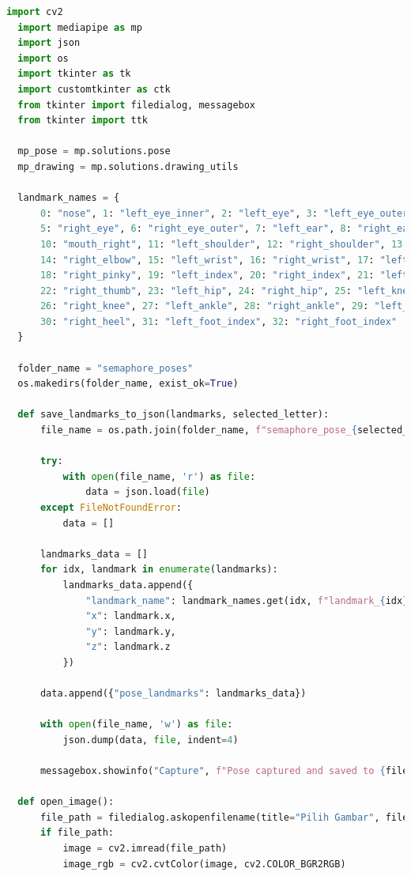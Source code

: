 \documentclass[a4paper,12pt]{article}
\begin{document}
\begin{lstlisting}[language=Python, caption={Kode Program untuk Mendeteksi Landmark Pose}]
  import cv2
  import mediapipe as mp
  import json
  import os
  import tkinter as tk
  import customtkinter as ctk
  from tkinter import filedialog, messagebox
  from tkinter import ttk
  
  mp_pose = mp.solutions.pose
  mp_drawing = mp.solutions.drawing_utils
  
  landmark_names = {
      0: "nose", 1: "left_eye_inner", 2: "left_eye", 3: "left_eye_outer", 4: "right_eye_inner",
      5: "right_eye", 6: "right_eye_outer", 7: "left_ear", 8: "right_ear", 9: "mouth_left", 
      10: "mouth_right", 11: "left_shoulder", 12: "right_shoulder", 13: "left_elbow", 
      14: "right_elbow", 15: "left_wrist", 16: "right_wrist", 17: "left_pinky", 
      18: "right_pinky", 19: "left_index", 20: "right_index", 21: "left_thumb", 
      22: "right_thumb", 23: "left_hip", 24: "right_hip", 25: "left_knee", 
      26: "right_knee", 27: "left_ankle", 28: "right_ankle", 29: "left_heel", 
      30: "right_heel", 31: "left_foot_index", 32: "right_foot_index"
  }
  
  folder_name = "semaphore_poses"
  os.makedirs(folder_name, exist_ok=True)
  
  def save_landmarks_to_json(landmarks, selected_letter):
      file_name = os.path.join(folder_name, f"semaphore_pose_{selected_letter}.json")
  
      try:
          with open(file_name, 'r') as file:
              data = json.load(file)
      except FileNotFoundError:
          data = []
  
      landmarks_data = []
      for idx, landmark in enumerate(landmarks):
          landmarks_data.append({
              "landmark_name": landmark_names.get(idx, f"landmark_{idx}"),
              "x": landmark.x,
              "y": landmark.y,
              "z": landmark.z
          })
  
      data.append({"pose_landmarks": landmarks_data})
  
      with open(file_name, 'w') as file:
          json.dump(data, file, indent=4)
      
      messagebox.showinfo("Capture", f"Pose captured and saved to {file_name}!")
  
  def open_image():
      file_path = filedialog.askopenfilename(title="Pilih Gambar", filetypes=[("Image files", "*.jpg;*.jpeg;*.png")])
      if file_path:
          image = cv2.imread(file_path)
          image_rgb = cv2.cvtColor(image, cv2.COLOR_BGR2RGB)
  

\end{lstlisting}
\end{document}
